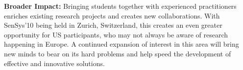 \documentclass[11pt,letterpaper]{article}
\begin{document}
\textbf{Broader Impact:} Bringing students together with experienced
practitioners enriches existing research projects and creates new
collaborations. With SenSys'10 being held in Zurich, Switzerland, this
creates an even greater opportunity for US participants, who may not always
be aware of research happening in Europe. A continued expansion of interest
in this area will bring new minds to bear on its hard problems and help speed
the development of effective and innovative solutions.

\vfill\eject


\end{document}
